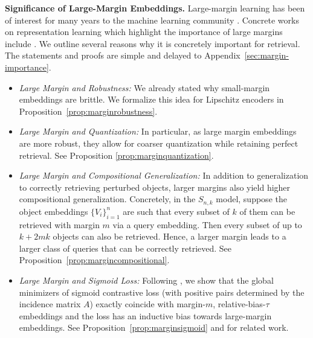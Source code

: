 \documentclass[preprint]{article}
\newcommand{\ksparsen}{S_{n,k}}
\begin{document}
\textbf{Significance of Large-Margin Embeddings.} Large-margin learning has been of interest for many years to the machine learning community \cite{novikoff1962convergence,cortes1995support,bartlett1998sample,freund1999large,cottersvm,zhu031normsvm,crammer02multiclasssvmlargemargin,smoladvancesinlargemargin,balcan2006kernels,arriaga2006algorithmic,bartlett2017spectrally}. Concrete works on representation learning which highlight the importance of large margins include 
\cite{balcan2008theory,
hadsell2006drlim,weinberger2009distance,schroff2015facenet,deng2019arcface,sokolic2017robust,elsayed2018large,robinson2021contrastive,
    bangachev2025globalminimizerssigmoidcontrastive}. We outline several reasons why it is concretely important for retrieval. The statements and proofs are simple and delayed to Appendix~\ref{sec:margin-importance}.
\begin{itemize}
    \item \emph{Large Margin and Robustness:} We already stated why small-margin embeddings are brittle. 
    We formalize this idea for Lipschitz encoders in Proposition~\ref{prop:marginrobustness}.
    \item \emph{Large Margin and Quantization:} In particular, as large margin embeddings are more robust, they allow for coarser quantization while retaining perfect retrieval. See Proposition \ref{prop:marginquantization}.
    \item \emph{Large Margin and Compositional Generalization:} In addition to generalization to correctly retrieving perturbed objects, larger margins also yield higher compositional generalization. Concretely, in the $\ksparsen$ model, suppose the object embeddings $\{V_i\}_{i = 1}^n$ are such that every subset of $k$ of them can be retrieved with margin $m$ via a query embedding. Then every subset of up to $k + 2mk$ objects can also be retrieved. Hence, a larger margin leads to a larger class of queries that can be correctly retrieved. See Proposition~\ref{prop:margincompositional}.
    \item \emph{Large Margin and Sigmoid Loss:} Following \cite{bangachev2025globalminimizerssigmoidcontrastive}, we show that the global minimizers of sigmoid contrastive loss (with positive pairs determined by the incidence matrix $A$) exactly coincide with margin-$m$, relative-bias-$\tau$ embeddings and the loss has 
    an inductive bias towards large-margin embeddings. See Proposition~\ref{prop:marginsigmoid} and \cite{soudry2018implicit} for related work.
\end{itemize}
\end{document}

